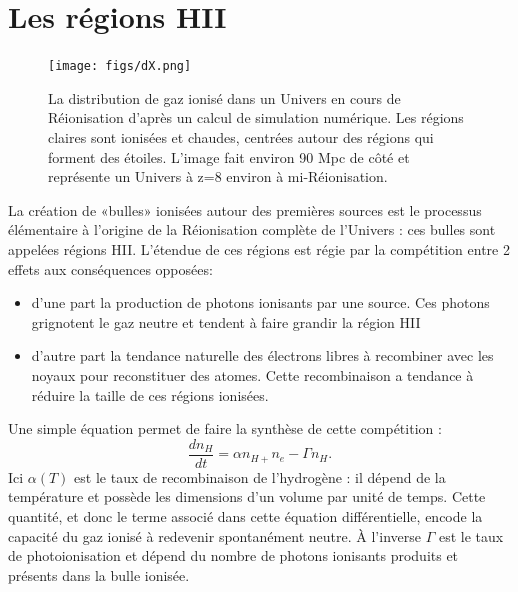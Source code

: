 \section{Les régions HII}

\begin{figure}[htbp]
	\centering
		\texttt{[image: figs/dX.png]}
		\caption[Le réseau de bulles ionisées de la Réionisation]{La distribution de gaz ionisé dans un Univers en cours de Réionisation d'après un calcul de simulation numérique. Les régions claires sont ionisées et chaudes, centrées autour des régions qui forment des étoiles. L'image fait environ 90 Mpc de côté et représente un Univers à z=8 environ à mi-Réionisation.}
	\label{f:dX}
\end{figure} 

La création de «bulles» ionisées autour des premières sources est le processus élémentaire à l'origine de la Réionisation complète de l'Univers : ces bulles sont appelées régions HII. L'étendue de ces régions est régie par la compétition entre 2 effets aux conséquences opposées:
\begin{itemize}
\item d'une part la production de photons ionisants par une source. Ces photons  grignotent le gaz neutre et tendent à faire grandir la région HII
\item d'autre part la tendance naturelle des électrons libres à recombiner avec les noyaux pour reconstituer des atomes. Cette recombinaison a tendance à réduire la taille de ces régions ionisées.
\end{itemize}
Une simple équation permet de faire la synthèse de cette compétition :
\begin{equation}
\frac{d n_H}{dt}=\alpha n_{H+}n_e -\Gamma n_H.
\end{equation}
Ici $\alpha(T)$ est le taux de recombinaison de l'hydrogène : il dépend de la température et possède les dimensions d'un volume par unité de temps. Cette quantité, et donc le terme associé dans cette équation différentielle, encode la capacité du gaz ionisé à redevenir spontanément neutre.  À l'inverse $\Gamma$ est le taux de photoionisation et dépend du nombre de photons ionisants produits et présents dans la bulle ionisée.

